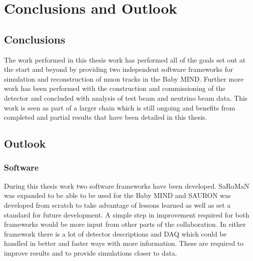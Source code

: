 \chapter{Conclusions and Outlook}
\label{c:conclusion}

\section{Conclusions}

The work performed in this thesis work has performed all of the goals set out at the start and beyond by providing two independent software frameworks for simulation and reconstruction of muon tracks in the Baby MIND. Further more work has been performed with the construction and commissioning of the detector and concluded with analysis of test beam and neutrino beam data. This work is seen as part of a larger chain which is still ongoing and benefits from completed and partial results that have been detailed in this thesis.

\pagebreak
\newpage
\section{Outlook}


\subsection{Software}

During this thesis work two software frameworks have been developed. SaRoMaN was expanded to be able to be used for the Baby MIND and SAURON was developed from scratch to take advantage of lessons learned as well as set a standard for future development. A simple step in improvement required for both frameworks would be more input from other parts of the collaboration. In either framework there is a lot of detector descriptions and DAQ which could be handled in better and faster ways with more information. These are required to improve results and to provide simulations closer to data.


